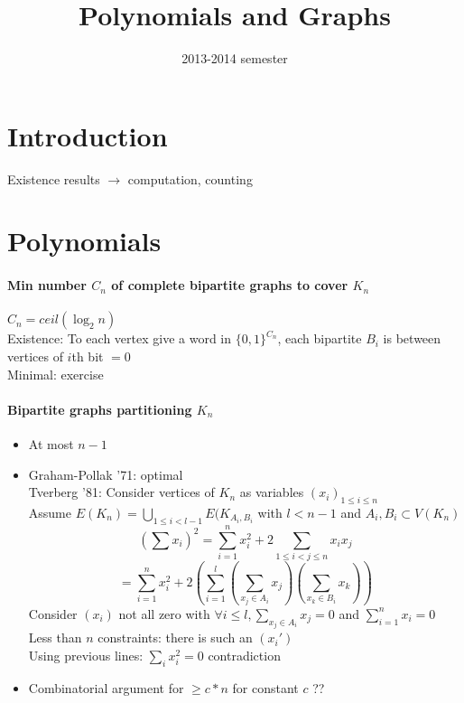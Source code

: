 \documentclass[12pt]{article}
\title{Polynomials and Graphs}
\date{2013-2014 \nth{1} semester}
\begin{document}
\maketitle

\newpage 
\tableofcontents

\newpage
\section{Introduction}
Existence results $\rightarrow$ computation, counting\\

\section{Polynomials}
\paragraph{Min number $C_n$ of complete bipartite graphs to cover $K_n$\\}
$C_n = ceil (\log_2 n)$\\
Existence: To each vertex give a word in $\{0,1\}^{C_n}$, each bipartite $B_i$ is between vertices of $i$th bit $= 0$\\
Minimal: exercise\\

\paragraph{Bipartite graphs partitioning $K_n$\\}
\begin{itemize}
\item At most $n-1$
\item Graham-Pollak '71: optimal\\
	Tverberg '81: Consider vertices of $K_n$ as variables $(x_i)_{1 \leqslant i \leqslant n}$\\
	Assume $E(K_n) = \bigcup\limits_{1 \leqslant i < l-1} E(K_{A_i,B_i}$ with $l < n-1$ and $A_i, B_i \subset V(K_n)$\\
	\[(\sum x_i)^2 = \sum\limits_{i=1}^n x_i^2 + 2 \sum\limits_{1 \leqslant i < j \leqslant n} x_i x_j\]
	\[ = \sum\limits_{i=1}^n x_i^2 + 2 \left( \sum\limits_{i=1}^l \left( \sum\limits_{x_j \in A_i} x_j \right) \left( \sum\limits_{x_k \in B_i} x_k \right) \right) \]
	Consider $(x_i)$ not all zero with $\forall i \leqslant l, \sum\limits_{x_j \in A_i} x_j = 0$ and $\sum\limits_{i=1}^n x_i = 0$\\
	Less than $n$ constraints: there is such an $(x_i')$\\
	Using previous lines: $\sum\limits_i x_i^2 = 0$ contradiction
\item Combinatorial argument for $\geqslant c * n$ for constant $c$ ??	
\end{itemize}
\end{document}
